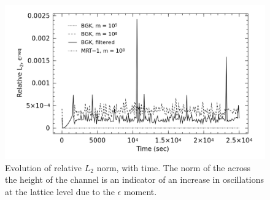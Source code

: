 \begin{figure}
	\centering
    \includegraphics[width=\linewidth]{figs/poise-bingham/epsilon}
    \caption{Evolution of relative $L_2$ norm, \DIFdelbeginFL {}\DIFdelendFL \DIFaddbeginFL {}\DIFaddendFL with time. The norm of the \DIFdelbeginFL {}\DIFdelendFL \DIFaddbeginFL {}\DIFaddendFL across the height of the channel is an indicator of an increase in oscillations at the lattice level due to the $\epsilon$ moment.}
    \label{fig:epsilon}
\end{figure}

